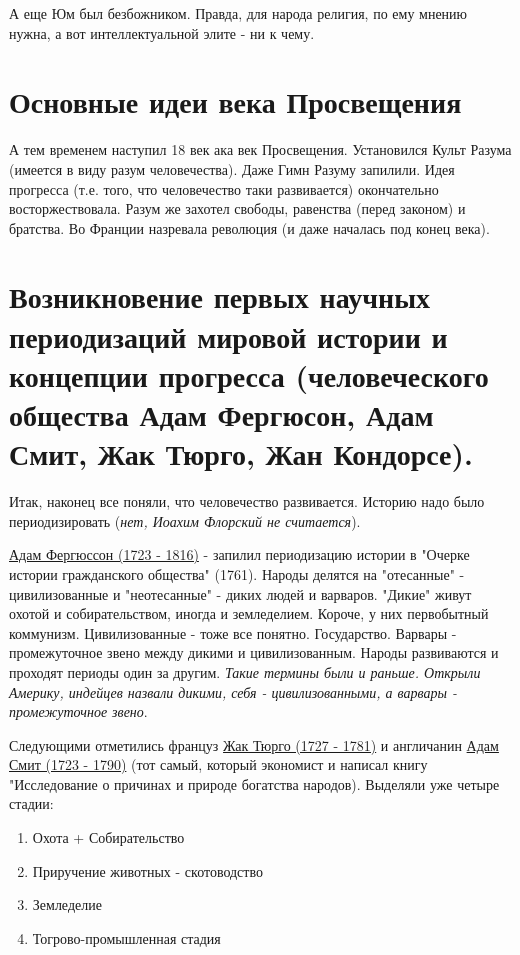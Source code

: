 А еще Юм был безбожником. Правда, для народа религия, по ему мнению нужна, а вот интеллектуальной элите - ни к чему.  

\section{Основные идеи века Просвещения}
А тем временем наступил 18 век ака век Просвещения. Установился Культ Разума (имеется в виду разум человечества). Даже Гимн Разуму запилили. Идея прогресса (т.е. того, что человечество таки развивается) окончательно восторжествовала.
Разум же захотел свободы, равенства (перед законом) и братства. Во Франции назревала революция (и даже началась под конец века). 

\section{Возникновение первых научных периодизаций мировой истории и концепции прогресса (человеческого общества Адам Фергюсон, Адам Смит, Жак Тюрго, Жан Кондорсе).}
Итак, наконец все поняли, что человечество развивается. Историю надо было периодизировать (\textit{нет, Иоахим Флорский не считается}).

\underline{Адам Фергюссон (1723 - 1816)} - запилил периодизацию истории в "Очерке истории гражданского общества" (1761). Народы делятся на "отесанные" - цивилизованные и "неотесанные" - диких людей и варваров. "Дикие" живут охотой и собирательством, иногда и земледелием. Короче, у них первобытный коммунизм. Цивилизованные - тоже все понятно. Государство. Варвары -  промежуточное звено между дикими и цивилизованным. Народы развиваются и проходят периоды один за другим.
\textit{Такие термины были и раньше. Открыли Америку, индейцев назвали дикими, себя - цивилизованными, а варвары - промежуточное звено}.

Следующими отметились француз \underline{Жак Тюрго (1727 - 1781)} и англичанин \underline{Адам Смит (1723 - 1790)} (тот самый, который экономист и написал книгу "Исследование о причинах и природе богатства народов). Выделяли уже четыре стадии:
\begin{enumerate}
\item Охота + Собирательство 
\item Приручение животных - скотоводство
\item Земледелие
\item Тогрово-промышленная стадия
\end{enumerate}

